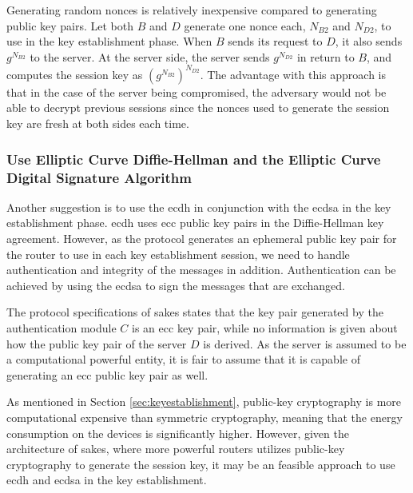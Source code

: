 Generating random nonces is relatively inexpensive compared to generating public key pairs. Let both $B$ and $D$ generate one nonce each, $N_{B2}$ and $N_{D2}$, to use in the key establishment phase. When $B$ sends its request to $D$, it also sends $g^{N_{B2}}$ to the server. At the server side, the server sends $g^{N_{D2}}$ in return to $B$, and computes the session key as $(g^{N_{B2}})^{N_{D2}}$. The advantage with this approach is that in the case of the server being compromised, the adversary would not be able to decrypt previous sessions since the nonces used to generate the session key are fresh at both sides each time. %


\subsubsection{Use Elliptic Curve Diffie-Hellman and the Elliptic Curve Digital Signature Algorithm}

Another suggestion is to use the \gls{ecdh} in conjunction with the \gls{ecdsa} \cite{johnson2001elliptic} in the key establishment phase. \gls{ecdh} uses \gls{ecc} public key pairs in the Diffie-Hellman key agreement. However, as the protocol generates an ephemeral public key pair for the router to use in each key establishment session, we need to handle authentication and integrity of the messages in addition. Authentication can be achieved by using the \gls{ecdsa} to sign the messages that are exchanged.

The protocol specifications of \gls{sakes} states that the key pair generated by the authentication module $C$ is an \gls{ecc} key pair, while no information is given about how the public key pair of the server $D$ is derived. As the server is assumed to be a computational powerful entity, it is fair to assume that it is capable of generating an \gls{ecc} public key pair as well.

As mentioned in Section \ref{sec:keyestablishment}, public-key cryptography is more computational expensive than symmetric cryptography, meaning that the energy consumption on the devices is significantly higher. However, given the architecture of \gls{sakes}, where more powerful routers utilizes public-key cryptography to generate the session key, it may be an feasible approach to use \gls{ecdh} and \gls{ecdsa} in the key establishment. 



